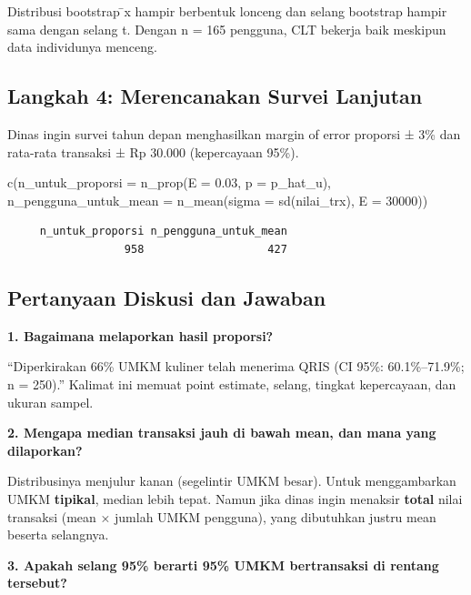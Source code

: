 \documentclass[
  indonesian,
  letterpaper,
]{book}
\newenvironment{Shaded}{\begin{snugshade}}{\end{snugshade}}
\newcommand{\AttributeTok}[1]{\textcolor[rgb]{0.40,0.45,0.13}{#1}}
\newcommand{\DecValTok}[1]{\textcolor[rgb]{0.68,0.00,0.00}{#1}}
\newcommand{\FloatTok}[1]{\textcolor[rgb]{0.68,0.00,0.00}{#1}}
\newcommand{\FunctionTok}[1]{\textcolor[rgb]{0.28,0.35,0.67}{#1}}
\newcommand{\NormalTok}[1]{\textcolor[rgb]{0.00,0.23,0.31}{#1}}
\begin{document}
Distribusi bootstrap ̄x hampir berbentuk lonceng dan selang bootstrap
hampir sama dengan selang t. Dengan n = 165 pengguna, CLT bekerja baik
meskipun data individunya menceng.

\subsection{Langkah 4: Merencanakan Survei
Lanjutan}\label{langkah-4-merencanakan-survei-lanjutan}

Dinas ingin survei tahun depan menghasilkan margin of error proporsi ±
3\% dan rata-rata transaksi ± Rp 30.000 (kepercayaan 95\%).

\begin{Shaded}
\begin{Highlighting}[]
\FunctionTok{c}\NormalTok{(}\AttributeTok{n\_untuk\_proporsi =} \FunctionTok{n\_prop}\NormalTok{(}\AttributeTok{E =} \FloatTok{0.03}\NormalTok{, }\AttributeTok{p =}\NormalTok{ p\_hat\_u),}
  \AttributeTok{n\_pengguna\_untuk\_mean =} \FunctionTok{n\_mean}\NormalTok{(}\AttributeTok{sigma =} \FunctionTok{sd}\NormalTok{(nilai\_trx), }\AttributeTok{E =} \DecValTok{30000}\NormalTok{))}
\end{Highlighting}
\end{Shaded}

\begin{verbatim}
     n_untuk_proporsi n_pengguna_untuk_mean 
                  958                   427 
\end{verbatim}

\subsection{Pertanyaan Diskusi dan
Jawaban}\label{pertanyaan-diskusi-dan-jawaban}

\textbf{1. Bagaimana melaporkan hasil proporsi?}

``Diperkirakan 66\% UMKM kuliner telah menerima QRIS (CI 95\%:
60.1\%--71.9\%; n = 250).'' Kalimat ini memuat point estimate, selang,
tingkat kepercayaan, dan ukuran sampel.

\textbf{2. Mengapa median transaksi jauh di bawah mean, dan mana yang
dilaporkan?}

Distribusinya menjulur kanan (segelintir UMKM besar). Untuk
menggambarkan UMKM \textbf{tipikal}, median lebih tepat. Namun jika
dinas ingin menaksir \textbf{total} nilai transaksi (mean × jumlah UMKM
pengguna), yang dibutuhkan justru mean beserta selangnya.

\textbf{3. Apakah selang 95\% berarti 95\% UMKM bertransaksi di rentang
tersebut?}
\end{document}
